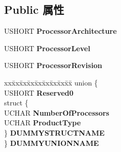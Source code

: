 \subsection*{Public 属性}
\begin{DoxyCompactItemize}
\item 
\mbox{\label{struct___m_i_n_i_d_u_m_p___s_y_s_t_e_m___i_n_f_o_a59276a074e78a5541b93d9c3bbc9a477}} 
U\+S\+H\+O\+RT {\bfseries Processor\+Architecture}
\item 
\mbox{\label{struct___m_i_n_i_d_u_m_p___s_y_s_t_e_m___i_n_f_o_ae173372e17e13a326725ac0f3ca6689d}} 
U\+S\+H\+O\+RT {\bfseries Processor\+Level}
\item 
\mbox{\label{struct___m_i_n_i_d_u_m_p___s_y_s_t_e_m___i_n_f_o_ac710de50d2d650499773708ed1afcf58}} 
U\+S\+H\+O\+RT {\bfseries Processor\+Revision}
\item 
\mbox{\label{struct___m_i_n_i_d_u_m_p___s_y_s_t_e_m___i_n_f_o_a84099a43c0f18bb60da096dc710d1463}} 
\begin{tabbing}
xx\=xx\=xx\=xx\=xx\=xx\=xx\=xx\=xx\=\kill
union \{\\
\>USHORT {\bfseries Reserved0}\\
\>struct \{\\
\>\>UCHAR {\bfseries NumberOfProcessors}\\
\>\>UCHAR {\bfseries ProductType}\\
\>\} {\bfseries DUMMYSTRUCTNAME}\\
\} {\bfseries DUMMYUNIONNAME}\\


\end{tabbing}
\end{DoxyCompactItemize}
